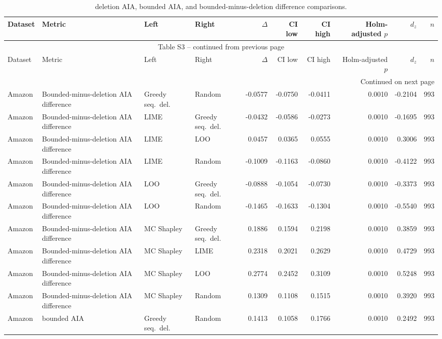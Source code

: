 \begin{longtable}{@{}p{}p{}p{}p{}rrrrrr@{}}
\caption{deletion AIA, bounded AIA, and bounded-minus-deletion difference comparisons.}\label{tab:S3}\\
\toprule
Dataset & Metric & Left & Right & $\Delta$ & CI low & CI high & Holm-adjusted $p$ & $d_z$ & $n$ \\
\midrule
\endfirsthead
\multicolumn{10}{c}{Table S3 -- continued from previous page}\\
\toprule
Dataset & Metric & Left & Right & $\Delta$ & CI low & CI high & Holm-adjusted $p$ & $d_z$ & $n$ \\
\midrule
\endhead
\midrule
\multicolumn{10}{r}{Continued on next page}\\
\endfoot
\bottomrule
\endlastfoot
Amazon & Bounded-minus-deletion AIA difference & Greedy seq.\ del. & Random & -0.0577 & -0.0750 & -0.0411 & 0.0010 & -0.2104 & 993 \\
Amazon & Bounded-minus-deletion AIA difference & LIME & Greedy seq.\ del. & -0.0432 & -0.0586 & -0.0273 & 0.0010 & -0.1695 & 993 \\
Amazon & Bounded-minus-deletion AIA difference & LIME & LOO & 0.0457 & 0.0365 & 0.0555 & 0.0010 & 0.3006 & 993 \\
Amazon & Bounded-minus-deletion AIA difference & LIME & Random & -0.1009 & -0.1163 & -0.0860 & 0.0010 & -0.4122 & 993 \\
Amazon & Bounded-minus-deletion AIA difference & LOO & Greedy seq.\ del. & -0.0888 & -0.1054 & -0.0730 & 0.0010 & -0.3373 & 993 \\
Amazon & Bounded-minus-deletion AIA difference & LOO & Random & -0.1465 & -0.1633 & -0.1304 & 0.0010 & -0.5540 & 993 \\
Amazon & Bounded-minus-deletion AIA difference & MC Shapley & Greedy seq.\ del. & 0.1886 & 0.1594 & 0.2198 & 0.0010 & 0.3859 & 993 \\
Amazon & Bounded-minus-deletion AIA difference & MC Shapley & LIME & 0.2318 & 0.2021 & 0.2629 & 0.0010 & 0.4729 & 993 \\
Amazon & Bounded-minus-deletion AIA difference & MC Shapley & LOO & 0.2774 & 0.2452 & 0.3109 & 0.0010 & 0.5248 & 993 \\
Amazon & Bounded-minus-deletion AIA difference & MC Shapley & Random & 0.1309 & 0.1108 & 0.1515 & 0.0010 & 0.3920 & 993 \\
Amazon & bounded AIA & Greedy seq.\ del. & Random & 0.1413 & 0.1058 & 0.1766 & 0.0010 & 0.2492 & 993 \\

\end{longtable}
